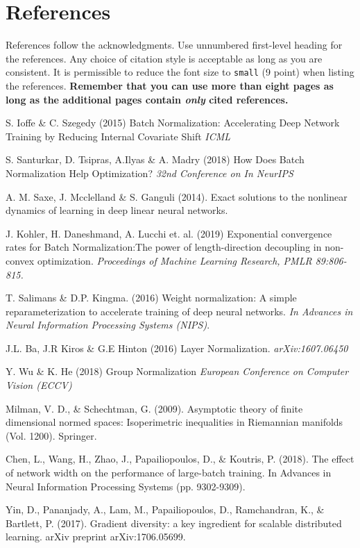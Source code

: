 \documentclass{article}
\begin{document}
\newpage
\section*{References}

References follow the acknowledgments. Use unnumbered first-level heading for
the references. Any choice of citation style is acceptable as long as you are
consistent. It is permissible to reduce the font size to \verb+small+ (9 point)
when listing the references. {\bf Remember that you can use more than eight
  pages as long as the additional pages contain \emph{only} cited references.}
\medskip

\small

\begin{thebibliography}{9}
S. Ioffe \& C. Szegedy (2015) Batch Normalization: Accelerating Deep Network Training by Reducing Internal Covariate Shift \textit{ICML}
 
S. Santurkar, D. Tsipras, A.Ilyas \& A. Madry (2018) How Does Batch Normalization Help Optimization? \textit{32nd Conference on In NeurIPS}

A. M. Saxe, J. Mcclelland \& S. Ganguli (2014). Exact solutions to the nonlinear dynamics of learning in deep linear neural networks.
 
J. Kohler, H. Daneshmand, A. Lucchi et. al. (2019) Exponential convergence rates for Batch Normalization:The power of length-direction decoupling in non-convex optimization. 	\textit{Proceedings of Machine Learning Research, PMLR 89:806-815.}

T. Salimans \& D.P. Kingma. (2016) Weight normalization: A simple reparameterization to accelerate
training of deep neural networks. \textit{In Advances in Neural Information Processing Systems (NIPS)}.

J.L. Ba, J.R Kiros \& G.E Hinton (2016) Layer Normalization. \textit{arXiv:1607.06450}

Y. Wu \& K. He (2018) Group Normalization \textit{European Conference on Computer Vision (ECCV)}

Milman, V. D., \& Schechtman, G. (2009). Asymptotic theory of finite dimensional normed spaces: Isoperimetric inequalities in Riemannian manifolds (Vol. 1200). Springer.

Chen, L., Wang, H., Zhao, J., Papailiopoulos, D., \& Koutris, P. (2018). The effect of network width on the performance of large-batch training. In Advances in Neural Information Processing Systems (pp. 9302-9309).

Yin, D., Pananjady, A., Lam, M., Papailiopoulos, D., Ramchandran, K., \& Bartlett, P. (2017). Gradient diversity: a key ingredient for scalable distributed learning. arXiv preprint arXiv:1706.05699.

\end{thebibliography}
\end{document}
